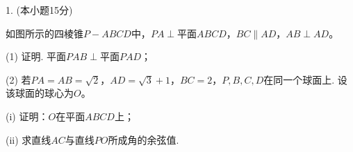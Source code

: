 \documentclass{article}
\begin{document}
1. (本小题15分)

如图所示的四棱锥\(P - ABCD\)中，\(PA\perp\)平面\(ABCD\)，\(BC\parallel AD\)，\(AB\perp AD\)。

(1) 证明. 平面\(PAB\perp\)平面\(PAD\)；

(2) 若\(PA = AB=\sqrt{2}\)，\(AD=\sqrt{3}+1\)，\(BC = 2\)，\(P,B,C,D\)在同一个球面上. 设该球面的球心为\(O\)。

(i) 证明：\(O\)在平面\(ABCD\)上；

(ii) 求直线\(AC\)与直线\(PO\)所成角的余弦值. 
\end{document}
